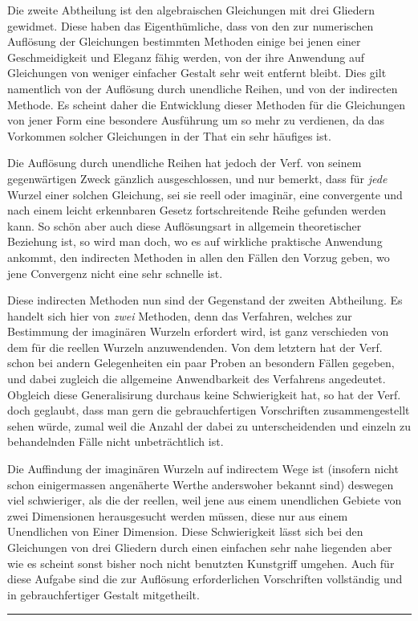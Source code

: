 Die zweite Abtheilung ist den algebraischen Gleichungen mit drei Gliedern gewidmet. Diese haben das Eigenthümliche, dass von den zur numerischen Auflösung der Gleichungen bestimmten Methoden einige bei jenen einer Geschmeidigkeit und Eleganz fähig werden, von der ihre Anwendung auf Gleichungen von weniger einfacher Gestalt sehr weit entfernt bleibt. Dies gilt namentlich von der
Auflösung durch unendliche Reihen, und von der indirecten Methode. Es scheint daher die Entwicklung dieser Methoden für die Gleichungen von jener Form eine besondere Ausführung um so mehr zu verdienen, da das Vorkommen solcher Gleichungen in der That ein sehr häufiges ist.

Die Auflösung durch unendliche Reihen hat jedoch der Verf. von seinem gegenwärtigen Zweck gänzlich ausgeschlossen, und nur bemerkt, dass für \textit{jede} Wurzel einer solchen Gleichung, sei sie reell oder imaginär, eine convergente und nach einem leicht erkennbaren Gesetz fortschreitende Reihe gefunden werden kann. So schön aber auch diese Auflösungsart in allgemein theoretischer Beziehung ist, so wird man doch, wo es auf wirkliche praktische Anwendung ankommt, den indirecten Methoden in allen den Fällen den Vorzug geben, wo jene Convergenz nicht eine sehr schnelle ist.

Diese indirecten Methoden nun sind der Gegenstand der zweiten Abtheilung. Es handelt sich hier von \textit{zwei} Methoden, denn das Verfahren, welches zur Bestimmung der imaginären Wurzeln erfordert wird, ist ganz verschieden von dem für die reellen Wurzeln anzuwendenden. Von dem letztern hat der Verf. schon bei andern Gelegenheiten ein paar Proben an besondern Fällen gegeben, und dabei zugleich die allgemeine Anwendbarkeit des Verfahrens angedeutet. Obgleich diese Generalisirung durchaus keine Schwierigkeit hat, so hat der Verf. doch geglaubt, dass man gern die gebrauchfertigen Vorschriften zusammengestellt sehen würde, zumal weil die Anzahl der dabei zu unterscheidenden und einzeln zu behandelnden Fälle nicht unbeträchtlich ist.

Die Auffindung der imaginären Wurzeln auf indirectem Wege ist (insofern nicht schon einigermassen angenäherte Werthe anderswoher bekannt sind) deswegen viel schwieriger, als die der reellen, weil jene aus einem unendlichen Gebiete von zwei Dimensionen herausgesucht werden müssen, diese nur aus einem Unendlichen von Einer Dimension. Diese Schwierigkeit lässt sich bei den Gleichungen von drei Gliedern durch einen einfachen sehr nahe liegenden aber wie es scheint sonst bisher noch nicht benutzten Kunstgriff umgehen. Auch für diese Aufgabe sind die zur Auflösung erforderlichen Vorschriften vollständig und in gebrauchfertiger Gestalt mitgetheilt.
\par\noindent\hfill\rule{0.30\linewidth}{0.4pt}\hfill\mbox{}\par

